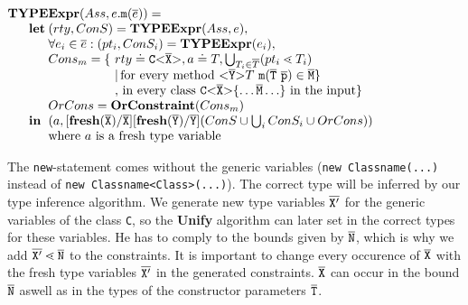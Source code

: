 \documentclass[runningheads]{llncs}
\begin{document}
\smallskip

$\begin{array}{@{}l@{}l@{}l}
\textbf{TY}& \textbf{PE} & \textbf{Expr} (Ass, e.\mathtt{m}(\overline{e}) ) = \\
& \textbf{let} %
& (rty, ConS) = \textbf{TYPEExpr}(Ass, e),\\
& & \forall e_i \in \overline{e} : (pt_i, ConS_i) = \textbf{TYPEExpr}(e_i)  ,\\
& & \begin{array}{@{}l@{}l}
        Cons_{m} = \{\ & rty \doteq \exptype{C}{\ol{X}}, a \doteq T, \bigcup_{T_i \in \overline{T}} (pt_i \lessdot T_i)\\
                    & |\, \text{for every method}\ \exptype{}{\ol{Y}} T\ \texttt{m}(\ol{T}\  \ol{p}) \in \ol{M} \} \\%
                    & ,\, \text{in every class}\ \exptype{C}{\ol{X}} \{ \ldots \ol{M} \ldots \}\ \text{in the input} \} 
                  \end{array}\\
& & OrCons = \textbf{OrConstraint}(Cons_{m})\\
& \mathbf{in}%
& (a, [\textbf{fresh}(\ol{X})/\ol{X}][\textbf{fresh}(\ol{Y})/\ol{Y}](ConS \cup \bigcup_i ConS_i \cup OrCons))\\
& & \text{where\ } a \text{\ is\ a\ fresh\
  type\ variable}\\ 
\end{array}
$

\smallskip

The \texttt{new}-statement comes without the generic variables
(\texttt{new Classname(...)} instead of \texttt{new Classname<Class>(...)}).
The correct type will be inferred by our type inference algorithm.
We generate new type variables $\overline{\tt X'}$ for the generic variables of the class \texttt{C},
so the \textbf{Unify} algorithm can later set in the correct types for these variables.
He has to comply to the bounds given by $\overline{\tt N}$, which is why we add $\overline{\tt X'} \lessdot \overline{\tt N}$ to the constraints.
It is important to change every occurence of $\overline{\tt X}$ with the fresh type variables $\overline{\tt X'}$ in the generated constraints.
$\overline{\tt X}$ can occur in the bound $\overline{\tt N}$ aswell as in the types of the constructor parameters $\overline{\tt T}$.
\end{document}
